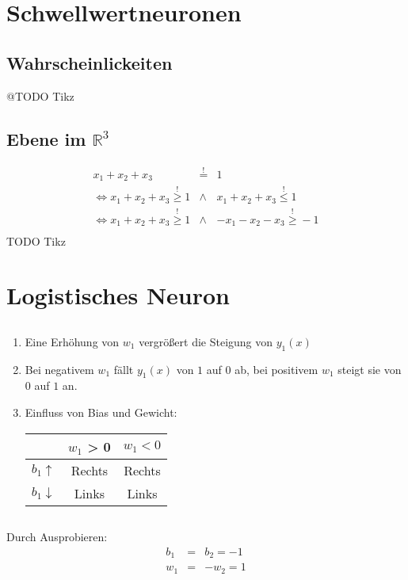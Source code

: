 \documentclass[DIN, pagenumber=false, fontsize=11pt, parskip=half]{scrartcl}
\begin{document}
    \section{Schwellwertneuronen}
    \subsection{Wahrscheinlickeiten}
    @TODO Tikz
    \subsection{Ebene im $\mathbb{R}^3$}
    \begin{eqnarray*}
        x_1 + x_2 + x_3 &\stackrel{!}{=}& 1 \\ 
        \Leftrightarrow x_1 + x_2 + x_3 \stackrel{!}{\geq} 1 &\land& x_1 + x_2 + x_3 \stackrel{!}{\leq} 1\\
        \Leftrightarrow x_1 + x_2 + x_3 \stackrel{!}{\geq} 1 &\land&  - x_1 - x_2 - x_3 \stackrel{!}{\geq} -1\\
    \end{eqnarray*}
    TODO Tikz
    \section{Logistisches Neuron}
    \subsection{}
    \begin{enumerate}[label=(\alph*)]
        \item Eine Erhöhung von $w_1$ vergrößert die Steigung von $y_1(x)$
        \item Bei negativem $w_1$ fällt $y_1(x)$ von $1$ auf $0$ ab, bei positivem $w_1$ steigt sie von $0$ auf $1$ an.
        \item Einfluss von Bias und Gewicht:
            \begin{table}[H]
                \centering
                \begin{tabular}{ccc}
                    \toprule
                     & $w_1$ > 0 & $w_1 < 0$ \\
                     \midrule
                     $b_1 \uparrow $ & Rechts & Rechts\\
                     $b_1 \downarrow$ & Links & Links\\
                     \bottomrule
                \end{tabular}
            \end{table}
    \end{enumerate}
    \subsection{}
    Durch Ausprobieren:
    \begin{eqnarray*}
        b_1 &=& b_2 = -1 \\
        w_1 &=& -w_2 = 1 \\
    \end{eqnarray*}
\end{document}
